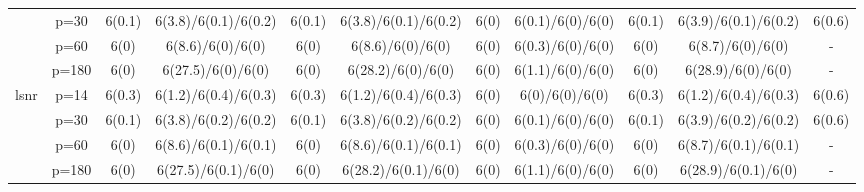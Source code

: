\begin{table}[ht]
{\begin{tabular}{|c|c|cc|cc|cc|cc|c|}
   & p=30 & 6(0.1) & 6(3.8)/6(0.1)/6(0.2) & 6(0.1) & 6(3.8)/6(0.1)/6(0.2) & 6(0) & 6(0.1)/6(0)/6(0) & 6(0.1) & 6(3.9)/6(0.1)/6(0.2) & 6(0.6) \\ 
   & p=60 & 6(0) & 6(8.6)/6(0)/6(0) & 6(0) & 6(8.6)/6(0)/6(0) & 6(0) & 6(0.3)/6(0)/6(0) & 6(0) & 6(8.7)/6(0)/6(0) & - \\ 
   & p=180 & 6(0) & 6(27.5)/6(0)/6(0) & 6(0) & 6(28.2)/6(0)/6(0) & 6(0) & 6(1.1)/6(0)/6(0) & 6(0) & 6(28.9)/6(0)/6(0) & - \\ 
  \midrule\multirow{4}[2]{*}{lsnr} & p=14 & 6(0.3) & 6(1.2)/6(0.4)/6(0.3) & 6(0.3) & 6(1.2)/6(0.4)/6(0.3) & 6(0) & 6(0)/6(0)/6(0) & 6(0.3) & 6(1.2)/6(0.4)/6(0.3) & 6(0.6) \\ 
   & p=30 & 6(0.1) & 6(3.8)/6(0.2)/6(0.2) & 6(0.1) & 6(3.8)/6(0.2)/6(0.2) & 6(0) & 6(0.1)/6(0)/6(0) & 6(0.1) & 6(3.9)/6(0.2)/6(0.2) & 6(0.6) \\ 
   & p=60 & 6(0) & 6(8.6)/6(0.1)/6(0.1) & 6(0) & 6(8.6)/6(0.1)/6(0.1) & 6(0) & 6(0.3)/6(0)/6(0) & 6(0) & 6(8.7)/6(0.1)/6(0.1) & - \\ 
   & p=180 & 6(0) & 6(27.5)/6(0.1)/6(0) & 6(0) & 6(28.2)/6(0.1)/6(0) & 6(0) & 6(1.1)/6(0)/6(0) & 6(0) & 6(28.9)/6(0.1)/6(0) & - \\ 
   \bottomrule 
\end{tabular}
}
\end{table}
